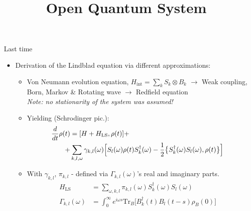 \documentclass[10pt,xcolor={table,dvipsnames},t]{beamer}
\title{Open Quantum System}
\subtitle{
  Lectures: \\ 
  \footnotesize
  \begin{itemize}
      \setlength\itemsep{-0.5em}
    { 
      \transparent{0.4}
    \item[] Last time:
    \item Daniel Manzano, A short introduction to the Lindblad master equation (\textit{all})
    \item Breuer and Petruccione, The Theory of Open Quantum Systems (\textit{ch. 3 - 4.3})
    \item Daniel A. Lidar, Notes on the Theory of Open Quantum Systems (\textit{up to ch. 12})
    }
  \item[] Today:
    \item Breuer and Petruccione, The Theory of Open Quantum Systems (\textit{ch. 3 - 4.3})
    \item Daniel A. Lidar, Notes on the Theory of Open Quantum Systems (\textit{up to ch. 12})
    \item B.Kraus, H.P.Buchler, S. Diehl, A. Kantian, A. Micheli, \& P. Zoller, Preparation of Entangled States by Quantum Markov Processes
    \item Buča, B., Tindall, J. \& Jaksch, D. Non-stationary coherent quantum many-body dynamics through dissipation
    \item Victor V. Albert \& Liang Jiang, Symmetries and conserved quantities in Lindblad master equations
    \item Cameron Booker, Berislav Buča, Dieter Jaksch, Non-stationarity and Dissipative Time Crystals: Spectral Properties and Finite-Size Effects
  \end{itemize}
  \vspace{-1cm}
}
\newcommand{\dt}{\frac{d}{dt}}
\newcommand{\Hint}{H_{\text{int}}}
\newcommand{\tr}[2]{\text{Tr}_{#1}\bigl[#2\bigr]}
\begin{document}
\begin{frame}
  \titlepage
\end{frame}


\begin{frame}{Last time}
\begin{itemize}
    \item<1-> Derivation of the Lindblad equation via different approximations:
      \begin{itemize}
        \item<2-> Von Neumann evolution equation, $\Hint=\sum_k S_k \otimes B_k$ $\rightarrow$ Weak coupling, Born, Markov \& Rotating wave $\rightarrow$ Redfield equation\\
          \textit{Note: no stationarity of the system was assumed!}
        \item<3-> Yielding (Schrodinger pic.): 
        \begin{equation}
          \begin{split}
            \dt \rho(t) &= [H+H_\text{LS}, \rho(t)] + \\
                        +&\sum_{k,l, \omega} \gamma_{k,l}(\omega) \Bigl[S_l(\omega)\rho(t)S_k^\dag(\omega) - \frac{1}{2}\bigl\{ S_k^\dag(\omega) S_l(\omega), \rho(t) \bigr\}\Bigr]
          \end{split}
        \end{equation}
      \item<4-> With $\gamma_{k,l}$, $\pi_{k,l}$ - defined via $\Gamma_{k,l}(\omega)$'s real and imaginary parts.
          \begin{equation}
            \begin{split}
              H_\text{LS} &= \sum_{\omega, k,l}\pi_{k,l}(\omega)S_k^\dag (\omega) S_l(\omega)\\
              \Gamma_{k,l}(\omega) &= \int_0^\infty e^{i\omega s} \tr{B}{B_k^\dag(t) B_l(t-s) \rho_B(0)}
            \end{split}
          \end{equation}
      \end{itemize}
\end{itemize}
\end{frame}
\end{document}
